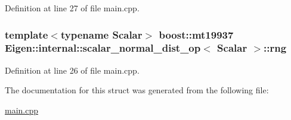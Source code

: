 Definition at line 27 of file main.\+cpp.

\hypertarget{struct_eigen_1_1internal_1_1scalar__normal__dist__op_aa088a6e6b0b17b44a1e409fd8e024969}{
\subsubsection[{rng}]{\setlength{\rightskip}{0pt plus 5cm}template$<$typename Scalar$>$ boost\+::mt19937 {\bf Eigen\+::internal\+::scalar\+\_\+normal\+\_\+dist\+\_\+op}$<$ Scalar $>$\+::rng\hspace{0.3cm}{\ttfamily [static]}}}\label{struct_eigen_1_1internal_1_1scalar__normal__dist__op_aa088a6e6b0b17b44a1e409fd8e024969}


Definition at line 26 of file main.\+cpp.



The documentation for this struct was generated from the following file\+:\begin{DoxyCompactItemize}
\item 
\hyperlink{main_8cpp}{main.\+cpp}\end{DoxyCompactItemize}
